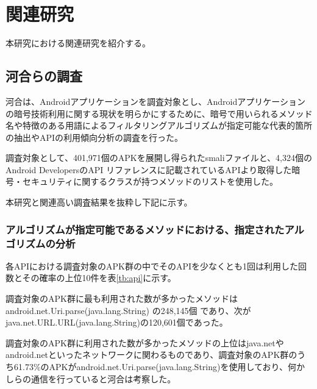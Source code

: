 \newpage
\section{関連研究} %
本研究における関連研究を紹介する。

\subsection{河合らの調査}
河合は、Androidアプリケーションを調査対象とし、Androidアプリケーションの暗号技術利用に関する現状を明らかにするために、暗号で用いられるメソッド名や特徴のある用語によるフィルタリングアルゴリズムが指定可能な代表的箇所の抽出やAPIの利用傾向分析の調査を行った。

調査対象として、401,971個のAPKを展開し得られたsmaliファイルと、4,324個のAndroid DevelopersのAPI リファレンスに記載されているAPIより取得した暗号・セキュリティに関するクラスが持つメソッドのリストを使用した。


本研究と関連高い調査結果を抜粋し下記に示す。

\subsubsection{アルゴリズムが指定可能であるメソッドにおける、指定されたアルゴリズムの分析}
各APIにおける調査対象のAPK群の中でそのAPIを少なくとも1回は利用した回数とその確率の上位10件を表\ref{tb:api}に示す。

調査対象のAPK群に最も利用された数が多かったメソッドは
android.net.Uri.parse(java.lang.String) の248,145個
であり、次がjava.net.URL.URL(java.lang.String)の120,601個であった。

調査対象のAPK群に利用された数が多かったメソッドの上位はjava.netやandroid.netといったネットワークに関わるものであり、調査対象のAPK群のうち61.73\%のAPKがandroid.net.Uri.parse(java.lang.String)を使用しており、何かしらの通信を行っていると河合は考察した。


